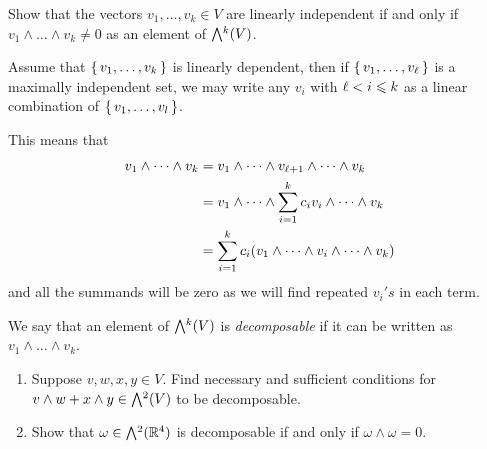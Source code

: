 \documentclass[12pt]{memoir}
\begin{document}
\begin{Ej}
    Show that the vectors $v_1, \ldots , v_k \in V$ are linearly independent if and only if $v_1 \wedge \ldots \wedge v_k \neq 0$ as an element of $\exterior^k(V)$.
\end{Ej}

\begin{ptcbr}
    Assume that $\{\,v_1,\dots,v_k\,\}$ is linearly dependent, then if $\{\,v_1,\dots,v_\ell\,\}$ is a maximally independent set, we may write any $v_i$ with $\ell<i\leqslant k$ as a linear combination of $\{\,v_1,\dots,v_l\,\}$.\par
    This means that 
    \begin{align*}
        v_1\wedge\cdots\wedge v_k&=v_1\wedge\cdots\wedge v_{\ell+1}\wedge\cdots\wedge v_k\\
        &=v_1\wedge\cdots\wedge \sum_{i=1}^kc_iv_i\wedge\cdots\wedge v_k\\
        &=\sum_{i=1}^kc_i(v_1\wedge\cdots\wedge v_i\wedge\cdots\wedge v_k)
    \end{align*}
    and all the summands will be zero as we will find repeated $v_i's$ in each term.\par
\end{ptcbr}

\begin{Ej}
    We say that an element of $\exterior^k(V)$ is \emph{decomposable} if it can be written as $v_1 \wedge \ldots \wedge v_k$.
	\begin{enumerate}
		\item Suppose $v,w,x,y \in V$. Find necessary and sufficient conditions for $v \wedge w + x \wedge y \in \exterior^2(V)$ to be decomposable.
		
		\item Show that $\omega \in \exterior^{2}(\bR^4)$ is decomposable if and only if $\omega \wedge \omega = 0$.
	\end{enumerate}
\end{Ej}
\end{document}
